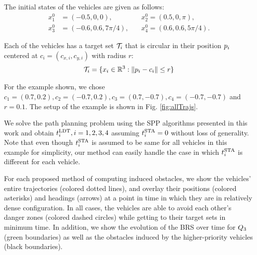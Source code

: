 The initial states of the vehicles are given as follows:
\begin{equation}
\begin{aligned}
x_1^0 &= (-0.5, 0, 0), \quad &x_2^0 = (0.5, 0, \pi), \\
x_3^0 &= \left(-0.6, 0.6, 7\pi/4\right), \quad &x_4^0 = \left(0.6, 0.6, 5\pi/4\right).
\end{aligned}
\end{equation}

\noindent Each of the vehicles has a target set $\mathcal{T}_i$ that is circular in their position $p_i$ centered at $c_i = (c_{x,i}, c_{y,i})$ with radius $r$:
\vspace{-0.2em}
\begin{equation}
\mathcal{T}_i = \{x_i \in \mathbb{R}^3: \|p_i - c_i\| \le r\}
\end{equation}

\noindent For the example shown, we chose $c_1 = (0.7, 0.2), c_2 = (-0.7, 0.2), c_3 = (0.7, -0.7), c_4 = (-0.7, -0.7)$ and $r = 0.1$. The setup of the example is shown in Fig. \ref{fig:allTrajs}.

We solve the path planning problem using the SPP algorithms presented in this work and obtain $t^\text{LDT}_i, i=1,2,3,4$ assuming $t^\text{STA}_i=0$ without loss of generality. Note that even though $t^\text{STA}_i$ is assumed to be same for all vehicles in this example for simplicity, our method can easily handle the case in which $t^\text{STA}_i$ is different for each vehicle.

For each proposed method of computing induced obstacles, we show the vehicles' entire trajectories (colored dotted lines), and overlay their positions (colored asterisks) and headings (arrows) at a point in time in which they are in relatively dense configuration. In all cases, the vehicles are able to avoid each other's danger zones (colored dashed circles) while getting to their target sets in minimum time. In addition, we show the evolution of the BRS over time for $Q_3$ (green boundaries) as well as the obstacles induced by the higher-priority vehicles (black boundaries).

